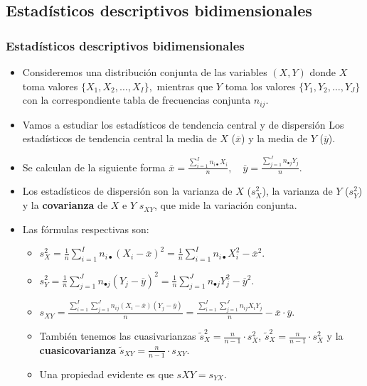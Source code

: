 \subsection{Estadísticos descriptivos bidimensionales}

\begin{frame}
\frametitle{Estadísticos descriptivos bidimensionales}
\begin{itemize}
\item Consideremos una distribución conjunta de las variables $(X,Y)$ donde $X$  toma valores $\{X_1,X_2,\ldots,X_I\}, $ mientras que $Y$ toma los valores $\{Y_1,Y_2,\ldots,Y_J\}$ con la correspondiente tabla de frecuencias conjunta   $n_{ij}$.
\item 
Vamos  a estudiar los estadísticos de tendencia central y de dispersión
Los estadísticos de tendencia central la media de $X$ ($\overline{x}$) y la media de $Y$
($\overline{y}$). 
\item Se calculan de la siguiente forma $\overline{x}=\frac{\sum\limits_{i=1}^{I}n_{i\bullet} X_i}{n},\quad
\overline{y}=\frac{\sum\limits_{j=1}^{J}n_{\bullet j} Y_j}{n}$.
\item Los  estadísticos de dispersión son la varianza de $X$ ($s_X^2$), la varianza de $Y$
($s_Y^2$) y la \textbf{covarianza} de $X$  e $Y$ $s_{XY}$, que mide la variación conjunta.
\end{itemize}
\end{frame}

\begin{frame}
\begin{itemize}
\item Las fórmulas respectivas son:
\begin{itemize}
\item $s_X^2=  \frac{1}{n}\sum\limits_{i=1}^I n_{i\bullet}\left(X_i-\overline{x}\right)^2 =
\frac{1}{n}\sum\limits_{i=1}^I n_{i\bullet}X_i^2 -\overline{x}^2.$
\item  $s_Y^2=\frac{1}{n}\sum\limits_{j=1}^J n_{\bullet j}\left(Y_j-\overline{y}\right)^2 =
\frac{1}{n}\sum\limits_{j=1}^J n_{\bullet j}Y_j^2 -\overline{y}^2$. 
\item $s_{XY}= \frac{\sum\limits_{i=1}^I\sum\limits_{j=1}^J n_{ij}\left(X_i-\overline{x}\right)\left(Y_j-\overline{y}\right)}{n}=
   \frac{\sum\limits_{i=1}^I\sum\limits_{j=1}^J n_{ij}X_i Y_j}{n} -\overline{x}\cdot\overline{y}.$
\item También  tenemos las cuasivarianzas $\tilde{s}_X^2=\frac{n}{n-1}\cdot s_X^2 $, $\tilde{s}_X^2=\frac{n}{n-1}\cdot s_X^2 $
 y  la \textbf{cuasicovarianza} $\tilde{s}_{XY}= \frac{n}{n-1}\cdot s_{XY}$.
\item Una propiedad evidente es que $s{XY}=s_{YX}$.
\end{itemize}
\end{itemize}
\end{frame}

